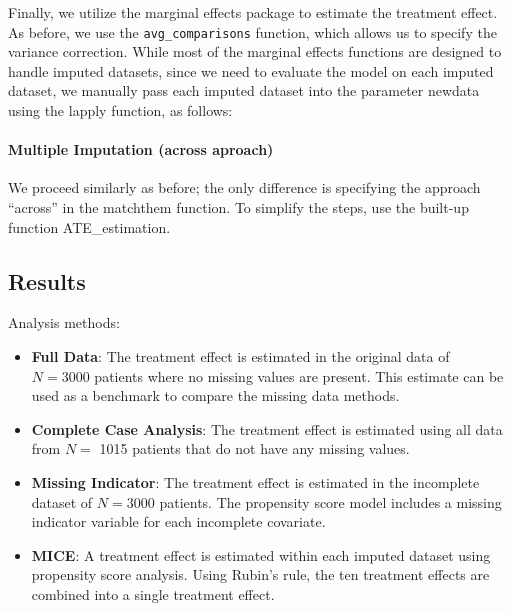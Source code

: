 \documentclass[
  letterpaper,
  DIV=11,
  numbers=noendperiod]{scrreprt}
\let\oldparagraph\paragraph
\renewcommand{\paragraph}[1]{\oldparagraph{#1}\mbox{}}
\newenvironment{Shaded}{\begin{snugshade}}{\end{snugshade}}
\newcommand{\AttributeTok}[1]{\textcolor[rgb]{0.40,0.45,0.13}{#1}}
\newcommand{\FunctionTok}[1]{\textcolor[rgb]{0.28,0.35,0.67}{#1}}
\newcommand{\NormalTok}[1]{\textcolor[rgb]{0.00,0.23,0.31}{#1}}
\newcommand{\OtherTok}[1]{\textcolor[rgb]{0.00,0.23,0.31}{#1}}
\newcommand{\SpecialCharTok}[1]{\textcolor[rgb]{0.37,0.37,0.37}{#1}}
\newcommand{\StringTok}[1]{\textcolor[rgb]{0.13,0.47,0.30}{#1}}
\providecommand{\tightlist}{%
  \setlength{\itemsep}{0pt}\setlength{\parskip}{0pt}}\usepackage{longtable,booktabs,array}
\begin{document}
Finally, we utilize the marginal effects package to estimate the
treatment effect. As before, we use the \texttt{avg\_comparisons}
function, which allows us to specify the variance correction. While most
of the marginal effects functions are designed to handle imputed
datasets, since we need to evaluate the model on each imputed dataset,
we manually pass each imputed dataset into the parameter newdata using
the lapply function, as follows:

\hypertarget{multiple-imputation-across-aproach}{%
\paragraph{Multiple Imputation (across
aproach)}\label{multiple-imputation-across-aproach}}

We proceed similarly as before; the only difference is specifying the
approach ``across'' in the matchthem function. To simplify the steps,
use the built-up function ATE\_estimation.

\begin{Shaded}
\end{Shaded}

\hypertarget{results}{%
\subsection{Results}\label{results}}

Analysis methods:

\begin{itemize}
\tightlist
\item
  \textbf{Full Data}: The treatment effect is estimated in the original
  data of \(N=3000\) patients where no missing values are present. This
  estimate can be used as a benchmark to compare the missing data
  methods.
\item
  \textbf{Complete Case Analysis}: The treatment effect is estimated
  using all data from \(N=\) 1015 patients that do not have any missing
  values.
\item
  \textbf{Missing Indicator}: The treatment effect is estimated in the
  incomplete dataset of \(N=3000\) patients. The propensity score model
  includes a missing indicator variable for each incomplete covariate.
\item
  \textbf{MICE}: A treatment effect is estimated within each imputed
  dataset using propensity score analysis. Using Rubin's rule, the ten
  treatment effects are combined into a single treatment effect.
\end{itemize}
\end{document}
